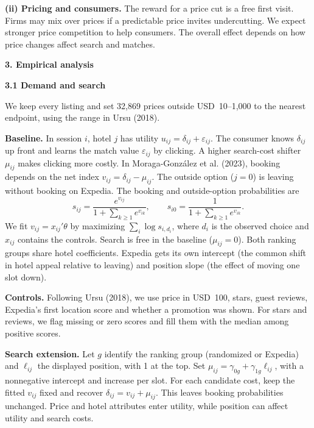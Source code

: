 \documentclass[a4paper,12pt]{article}
\newcommand{\subhead}[1]{\par\smallskip\noindent\textbf{#1}\par\nobreak\smallskip}
\newcommand{\mainhead}[1]{\par\medskip\noindent\textbf{#1}\par\nobreak\smallskip}
\begin{document}
\textbf{(ii) Pricing and consumers.} The reward for a price cut is a free first visit. Firms may mix over prices if a predictable price invites undercutting. We expect stronger price competition to help consumers. The overall effect depends on how price changes affect search and matches.

\mainhead{3. Empirical analysis}
\subhead{3.1 Demand and search}
We keep every listing and set 32,869 prices outside USD~10--1,000 to the nearest endpoint, using the range in Ursu (2018).

\textbf{Baseline.} In session $i$, hotel $j$ has utility $u_{ij}=\delta_{ij}+\varepsilon_{ij}$. The consumer knows $\delta_{ij}$ up front and learns the match value $\varepsilon_{ij}$ by clicking. A higher search-cost shifter $\mu_{ij}$ makes clicking more costly. In Moraga-González et al. (2023), booking depends on the net index $v_{ij}=\delta_{ij}-\mu_{ij}$. The outside option ($j=0$) is leaving without booking on Expedia. The booking and outside-option probabilities are
\[
 s_{ij}=\frac{e^{v_{ij}}}{1+\sum_{k\geq1}e^{v_{ik}}},\qquad
 s_{i0}=\frac{1}{1+\sum_{k\geq1}e^{v_{ik}}}.
\]
We fit $v_{ij}=x_{ij}'\theta$ by maximizing $\sum_i\log s_{i,d_i}$, where $d_i$ is the observed choice and $x_{ij}$ contains the controls. Search is free in the baseline ($\mu_{ij}=0$). Both ranking groups share hotel coefficients. Expedia gets its own intercept (the common shift in hotel appeal relative to leaving) and position slope (the effect of moving one slot down).

\textbf{Controls.} Following Ursu (2018), we use price in USD~100, stars, guest reviews, Expedia's first location score and whether a promotion was shown. For stars and reviews, we flag missing or zero scores and fill them with the median among positive scores.

\textbf{Search extension.} Let $g$ identify the ranking group (randomized or Expedia) and $\ell_{ij}$ the displayed position, with 1 at the top. Set $\mu_{ij}=\gamma_{0g}+\gamma_{1g}\ell_{ij}$, with a nonnegative intercept and increase per slot. For each candidate cost, keep the fitted $v_{ij}$ fixed and recover $\delta_{ij}=v_{ij}+\mu_{ij}$. This leaves booking probabilities unchanged. Price and hotel attributes enter utility, while position can affect utility and search costs.
\end{document}

